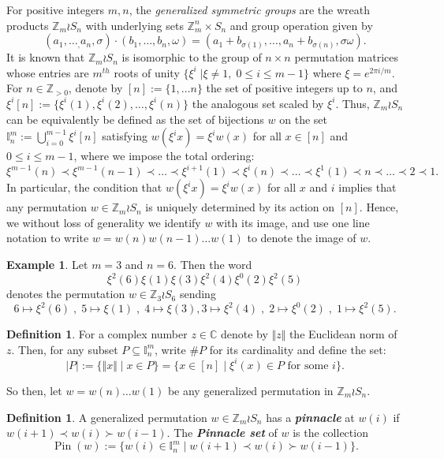 \documentclass[12pt,reqno]{amsart}
\numberwithin{equation}{section}
\theoremstyle{plain}
\theoremstyle{definition}
\newtheorem{definition}[theorem]{Definition}
\newtheorem{example}[theorem]{Example}
\theoremstyle{remark}
\newcommand{\Z}{\mathbb{Z}}
\newcommand{\I}{\mathbb{I}}
\newcommand{\Pin}{\operatorname{Pin}}
\newcommand{\newword}[1]{\emph{\textbf{#1}}}
\begin{document}
For positive integers $m,n$, the \emph{generalized symmetric groups} are the wreath products $\Z_m \wr S_n$ with underlying sets $\Z_m^n \times S_n$ and group operation given by \label{def: groupop}
\[ (a_1,\dots_,a_n, \sigma) \cdot (b_1,\dots,b_n, \omega) = (a_1+b_{\sigma(1)}, \dots, a_n+b_{\sigma(n)}, \sigma\omega).\]
It is known that $\Z_m \wr S_n$ is isomorphic to the group of $n\times n$ permutation matrices whose entries are $m^{th}$ roots of unity $\{\xi^i\;| \xi\neq 1,\; 0\leq i \leq m-1\}$ where $\xi= e^{2\pi i/m}$. 
For $n \in \Z_{>0}$, denote by $[n]:=\{1,\dots n\}$ the set of positive integers up to $n$, and $\xi^i[n]:=\{ \xi^i(1), \xi^i(2),\dots, \xi^i(n)\}$ the analogous set scaled by $\xi^i$. Thus, $\Z_m \wr S_n$ can be equivalently be defined as the set of bijections $w$ on the set $\I_n^m:=\bigcup_{i=0}^{m-1} \xi^i[n]$ satisfying $w(\xi^i x) = \xi^{i} w(x)$ for all $x \in [n]$ and $0\leq i\leq m-1$, where we impose the total ordering:
\[
\xi^{m-1}(n) \prec \xi^{m-1}(n-1)\prec \dots \prec\xi^{i+1}(1) \prec \xi^{i}(n)\prec \dots \prec \xi^{1}(1)\prec n \prec \dots \prec 2\prec 1.
\]
In particular, the condition that $w(\xi^i x) = \xi^{i} w(x)$ for all $x$ and $i$ implies that any permutation $w \in \Z_m \wr S_n$ is uniquely determined by its action on $[n]$. 
Hence, we without loss of generality we identify $w$ with its image, and use one line notation to write $w=w(n)w(n-1)\dots w(1)$ to denote the image of $w$.

\begin{example}
  Let $m=3$ and $n=6$. Then the word 
  \[\xi^2(6)\xi(1)\xi(3)\xi^2(4)\xi^0(2)\xi^2(5) \]
  denotes the permutation $w \in \Z_3 \wr S_6$ sending 
  \[
   6 \mapsto \xi^2(6)\; ,\; 5 \mapsto \xi(1) \;,\; 4 \mapsto \xi(3) , 3 \mapsto \xi^2(4) \;,\; 2 \mapsto \xi^0(2)\;,\; 1 \mapsto\xi^2(5).
  \]
\end{example}

\begin{definition} For a complex number $z \in \mathbb{C}$ denote by $\Vert z \Vert$ the Euclidean norm of $z$. Then, for any subset $P \subseteq \I_n^m$, write $\#P$ for its cardinality and define the set:
\[
|P|:=\{ \Vert x \Vert\;|\; x \in P\}= \{ x \in [n] \;| \; \xi^i(x) \in P \text{ for some } i\}.
\]
\end{definition}

So then, let $w=w(n)\dots w(1)$ be any generalized permutation in  $\Z_m \wr S_n$. 
\begin{definition}
A generalized permutation $w \in\Z_m \wr S_n$ has a \newword{pinnacle} at $w(i)$ if $w(i+1)\prec w(i) \succ w(i-1)$. The \newword{Pinnacle set} of $w$ is the collection
\[
\Pin(w):= \{ w(i) \in \I_n^m \; |\; w(i+1)\prec w(i)\succ w(i-1) \}.
\]
\end{definition}
\end{document}
